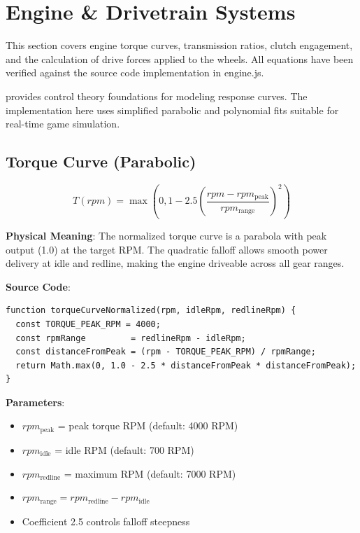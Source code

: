 \section{Engine \& Drivetrain Systems}

\label{sec:engine-drivetrain}

This section covers engine torque curves, transmission ratios, clutch engagement, and the calculation of drive forces applied to the wheels. All equations have been verified against the source code implementation in engine.js.

\cite{ogata2009modern} provides control theory foundations for modeling response curves. The implementation here uses simplified parabolic and polynomial fits suitable for real-time game simulation.

\subsection{Torque Curve (Parabolic)}

\begin{equation}
  T(rpm) = \max\left(0, 1 - 2.5 \left(\frac{rpm - rpm_{\text{peak}}}{rpm_{\text{range}}}\right)^2\right)
  \label{eq:torque-curve}
\end{equation}

\textbf{Physical Meaning}: The normalized torque curve is a parabola with peak output (1.0) at the target RPM. The quadratic falloff allows smooth power delivery at idle and redline, making the engine driveable across all gear ranges.

\textbf{Source Code}: 

\begin{lstlisting}[caption={Parabolic torque curve implementation}]
function torqueCurveNormalized(rpm, idleRpm, redlineRpm) {
  const TORQUE_PEAK_RPM = 4000;
  const rpmRange         = redlineRpm - idleRpm;
  const distanceFromPeak = (rpm - TORQUE_PEAK_RPM) / rpmRange;
  return Math.max(0, 1.0 - 2.5 * distanceFromPeak * distanceFromPeak);
}
\end{lstlisting}

\textbf{Parameters}:
\begin{itemize}
  \item $rpm_{\text{peak}}$ = peak torque RPM (default: 4000 RPM)
  \item $rpm_{\text{idle}}$ = idle RPM (default: 700 RPM)
  \item $rpm_{\text{redline}}$ = maximum RPM (default: 7000 RPM)
  \item $rpm_{\text{range}} = rpm_{\text{redline}} - rpm_{\text{idle}}$
  \item Coefficient 2.5 controls falloff steepness
\end{itemize}

